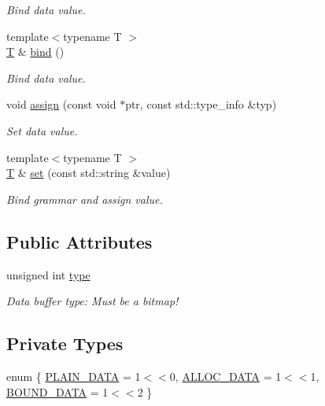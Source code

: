 \begin{DoxyCompactItemize}
\begin{DoxyCompactList}\small\item\em Bind data value. \end{DoxyCompactList}\item 
{\footnotesize template$<$typename T $>$ }\\\hyperlink{class_t}{T} \& \hyperlink{class_d_d4hep_1_1_opaque_data_block_a6ed751afee70c1b0ebb8afeed558b96b}{bind} ()
\begin{DoxyCompactList}\small\item\em Bind data value. \end{DoxyCompactList}\item 
void \hyperlink{class_d_d4hep_1_1_opaque_data_block_a3ba52c95bc948f9739239a29b2cc5a82}{assign} (const void $\ast$ptr, const std\+::type\+\_\+info \&typ)
\begin{DoxyCompactList}\small\item\em Set data value. \end{DoxyCompactList}\item 
{\footnotesize template$<$typename T $>$ }\\\hyperlink{class_t}{T} \& \hyperlink{class_d_d4hep_1_1_opaque_data_block_a3e940f2939e5783016a2274b2aecd512}{set} (const std\+::string \&value)
\begin{DoxyCompactList}\small\item\em Bind grammar and assign value. \end{DoxyCompactList}\end{DoxyCompactItemize}
\subsection*{Public Attributes}
\begin{DoxyCompactItemize}
\item 
unsigned int \hyperlink{class_d_d4hep_1_1_opaque_data_block_a6e7306f78bcdfcf15f53fdc6a2f34457}{type}
\begin{DoxyCompactList}\small\item\em Data buffer type\+: Must be a bitmap! \end{DoxyCompactList}\end{DoxyCompactItemize}
\subsection*{Private Types}
\begin{DoxyCompactItemize}
\item 
enum \{ \hyperlink{class_d_d4hep_1_1_opaque_data_block_a6c653f7754960906a4a260f035e915bca9c3e9fc003a5148f3f1707780b347eeb}{P\+L\+A\+I\+N\+\_\+\+D\+A\+TA} = 1$<$$<$0, 
\hyperlink{class_d_d4hep_1_1_opaque_data_block_a6c653f7754960906a4a260f035e915bca10ec45b910bc75641243cb866d304fa7}{A\+L\+L\+O\+C\+\_\+\+D\+A\+TA} = 1$<$$<$1, 
\hyperlink{class_d_d4hep_1_1_opaque_data_block_a6c653f7754960906a4a260f035e915bcafca2143abe27ac43e936bf63f6771b9e}{B\+O\+U\+N\+D\+\_\+\+D\+A\+TA} = 1$<$$<$2
 \}
\end{DoxyCompactItemize}
